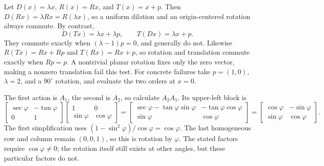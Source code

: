 Let $D(x)=\lambda x$, $R(x)=Rx$, and $T(x)=x+p$.
Then $D(Rx)=\lambda Rx=R(\lambda x)$, so a uniform dilation and an
origin-centered rotation always commute.
By contrast,
\[
 D(Tx)=\lambda x+\lambda p,\qquad T(Dx)=\lambda x+p.
\]
They commute exactly when $(\lambda-1)p=0$, and generally do not.
Likewise $R(Tx)=Rx+Rp$ and $T(Rx)=Rx+p$, so rotation and translation
commute exactly when $Rp=p$. A nontrivial planar rotation fixes only the
zero vector, making a nonzero translation fail this test.
For concrete failures take $p=(1,0)$, $\lambda=2$, and a $90^\circ$
rotation, and evaluate the two orders at $x=0$.

The first action is $A_1$, the second is $A_2$, so calculate $A_2A_1$.
Its upper-left block is
\[
 \begin{bmatrix}\sec\varphi&-\tan\varphi\\0&1\end{bmatrix}
 \begin{bmatrix}1&0\\\sin\varphi&\cos\varphi\end{bmatrix}
 =\begin{bmatrix}
 \sec\varphi-\tan\varphi\sin\varphi&-\tan\varphi\cos\varphi\\
 \sin\varphi&\cos\varphi
 \end{bmatrix}
 =\begin{bmatrix}\cos\varphi&-\sin\varphi\\\sin\varphi&\cos\varphi\end{bmatrix}.
\]
The first simplification uses
$(1-\sin^2\varphi)/\cos\varphi=\cos\varphi$.
The last homogeneous row and column remain $(0,0,1)$, so this is rotation
by $\varphi$. The stated factors require $\cos\varphi\ne0$; the rotation
itself still exists at other angles, but these particular factors do not.

